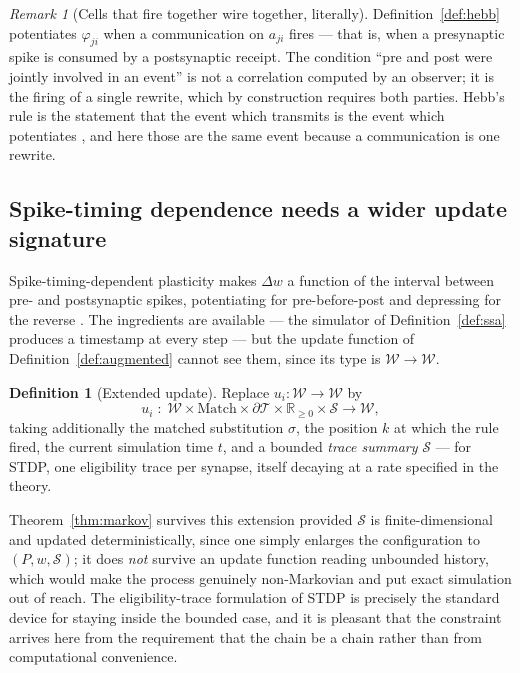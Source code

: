 \documentclass[11pt,a4paper]{article}
\theoremstyle{plain}
\theoremstyle{definition}
\newtheorem{definition}[theorem]{Definition}
\theoremstyle{remark}
\newtheorem{remark}[theorem]{Remark}
\newcommand{\Terms}{\mathcal{T}}
\newcommand{\Wt}{\mathcal{W}}
\newcommand{\wmap}{w}
\begin{document}
\begin{remark}[Cells that fire together wire together, literally]
Definition~\ref{def:hebb} potentiates $\varphi_{ji}$ when a communication on $a_{ji}$ fires --- that
is, when a presynaptic spike is consumed by a postsynaptic receipt. The condition ``pre and post were
jointly involved in an event'' is not a correlation computed by an observer; it is the firing of a
single rewrite, which by construction requires both parties. Hebb's rule is the statement that the
event which transmits is the event which potentiates \cite{hebb}, and here those are the same event
because a communication is one rewrite.
\end{remark}

\subsection{Spike-timing dependence needs a wider update signature}
\label{sec:stdp}

Spike-timing-dependent plasticity makes $\Delta w$ a function of the interval between pre- and
postsynaptic spikes, potentiating for pre-before-post and depressing for the reverse \cite{stdp}.
The ingredients are available --- the simulator of Definition~\ref{def:ssa} produces a timestamp at
every step --- but the update function of Definition~\ref{def:augmented} cannot see them, since its
type is $\Wt \to \Wt$.

\begin{definition}[Extended update]
\label{def:extended-update}
Replace $u_i : \Wt \to \Wt$ by
\[
u_i \;:\; \Wt \times \mathrm{Match} \times \partial\Terms \times \mathbb{R}_{\geq 0} \times \mathcal{S} \longrightarrow \Wt ,
\]
taking additionally the matched substitution $\sigma$, the position $k$ at which the rule fired, the
current simulation time $t$, and a bounded \emph{trace summary} $\mathcal{S}$ --- for STDP, one
eligibility trace per synapse, itself decaying at a rate specified in the theory.
\end{definition}

Theorem~\ref{thm:markov} survives this extension provided $\mathcal{S}$ is finite-dimensional and
updated deterministically, since one simply enlarges the configuration to
$(P, \wmap, \mathcal{S})$; it does \emph{not} survive an update function reading unbounded history,
which would make the process genuinely non-Markovian and put exact simulation out of reach. The
eligibility-trace formulation of STDP is precisely the standard device for staying inside the
bounded case, and it is pleasant that the constraint arrives here from the requirement that the
chain be a chain rather than from computational convenience.
\end{document}
